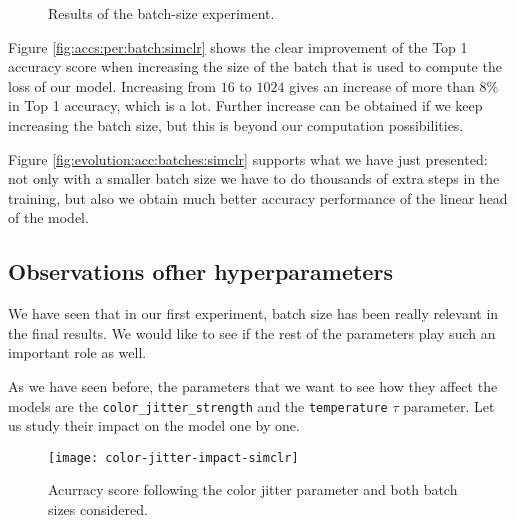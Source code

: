 \begin{figure}[htp] 
    \centering
    \hfill%
        \caption{Results of the batch-size experiment.}
\end{figure}

Figure \ref{fig:accs:per:batch:simclr} shows the clear improvement of the Top 1 accuracy score when increasing the size of the batch that is used to compute the loss of our model. Increasing from $16$ to $1024$ gives an increase of more than $8\%$ in Top 1 accuracy, which is a lot. Further increase can be obtained if we keep increasing the batch size, but this is beyond our computation possibilities.

Figure \ref{fig:evolution:acc:batches:simclr} supports what we have just presented: not only with a smaller batch size we have to do thousands of extra steps in the training, but also we obtain much better accuracy performance of the linear head of the model.

\subsection*{Observations ofher hyperparameters}

We have seen that in our first experiment, batch size has been really relevant in the final results. We would like to see if the rest of the parameters play such an important role as well. 

As we have seen before, the parameters that we want to see how they affect the models are the \lstinline{color_jitter_strength} and the \lstinline{temperature} $\tau$ parameter. Let us study their impact on the model one by one. 

\begin{figure}[H] 
    \centering
    \texttt{[image: color-jitter-impact-simclr]}%
    
    \label{exp:simclr:colorjitter:impact}
    \caption{Acurracy score following the color jitter parameter and both batch sizes considered.}
\end{figure}

